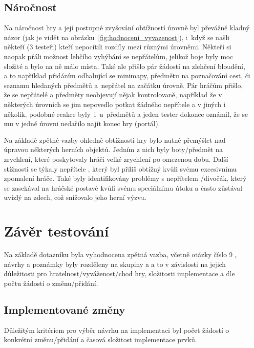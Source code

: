 \subsection*{Náročnost}
Na náročnost hry a její postupné zvyšování obtížností úrovně byl převážně kladný názor (jak je vidět na obrázku~\ref{fig:hodnoceni_vyvazenost}), i~když se našli někteří (3 testeři) kteří nepocítili rozdíly mezi různými úrovněmi. Někteří si naopak přáli možnost lehčího vyhýbání se nepřátelům, jelikož boje byly moc složité a bylo na ně málo místa. Také ale přišlo pár žádostí na zlehčení bloudění, a to například přidáním odhalující se minimapy, předmětu na poznačování cest, či seznamu hledaných předmětů a~nepřátel na začátku úrovně. Pár hráčům přišlo, že se nepřátelé a předměty neobjevují nějak kontrolovaně, například že v některých úrovních se jim nepovedlo potkat žádného nepřítele a v jiných i několik, podobné reakce byly~i~u~předmětů a jeden tester dokonce oznámil, že se mu v jedné úrovni nedařilo najít konec hry (portál). 

Na základě zpětné vazby ohledně obtížnosti hry bylo nutné přemýšlet nad úpravou některých herních objektů. Jedním z nich byly boty/předmět na zrychlení, které poskytovaly hráči velké zrychlení po omezenou dobu. Další stížnosti se týkaly nepřítele , který byl příliš obtížný kvůli svému excesivnímu zpomalení hráče. Také byly identifikovány problémy s nepřítelem /divočák, který se zasekával na hráčské postavě kvůli svému speciálnímu útoku a často zůstával uvízlý na zdech, což snižovalo jeho herní výzvu.

\section{Závěr testování}
Na základě dotazníku byla vyhodnocena zpětná vazba, včetně otázky číslo 9 , návrhy a poznámky byly rozděleny na skupiny  a  a to v závislosti na jejich důležitosti pro hratelnost/vyváženost/chod hry, složitosti implementace a dle počtu žádostí o změnu/přidání.

\subsection*{Implementované změny}
Důležitým kritériem pro výběr návrhu na implementaci byl počet žádostí o konkrétní změnu/přidání a časová složitost implementace prvků.

